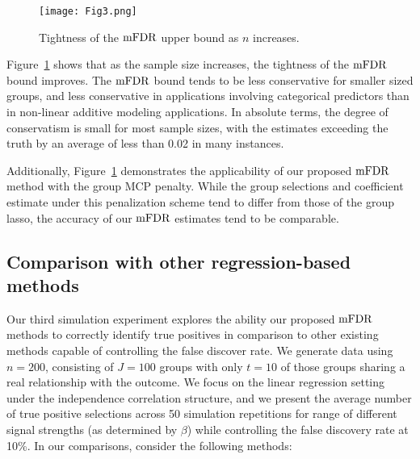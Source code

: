 \begin{figure} [!htb]
\centering
\texttt{[image: Fig3.png]}
\caption{\label{Fig:conv} Tightness of the $\textrm{mFDR}$ upper bound as $n$ increases.}
\end{figure}


Figure~\ref{Fig:conv} shows that as the sample size increases, the tightness of the $\textrm{mFDR}$ bound improves.  The $\textrm{mFDR}$ bound tends to be less conservative for smaller sized groups, and less conservative in applications involving categorical predictors than in non-linear additive modeling applications. In absolute terms, the degree of conservatism is small for most sample sizes, with the estimates exceeding the truth by an average of less than 0.02 in many instances.

Additionally, Figure~\ref{Fig:conv} demonstrates the applicability of our proposed $\textrm{mFDR}$ method with the group MCP penalty. While the group selections and coefficient estimate under this penalization scheme tend to differ from those of the group lasso, the accuracy of our $\textrm{mFDR}$ estimates tend to be comparable.  

\subsection{Comparison with other regression-based methods}
\label{Sub:comp}

Our third simulation experiment explores the ability our proposed $\textrm{mFDR}$ methods to correctly identify true positives in comparison to other existing methods capable of controlling the false discover rate. We generate data using $n = 200$, consisting of $J = 100$ groups with only $t = 10$ of those groups sharing a real relationship with the outcome. We focus on the linear regression setting under the independence correlation structure, and we present the average number of true positive selections across 50 simulation repetitions for range of different signal strengths (as determined by $\beta$) while controlling the false discovery rate at 10\%. In our comparisons, consider the following methods:


